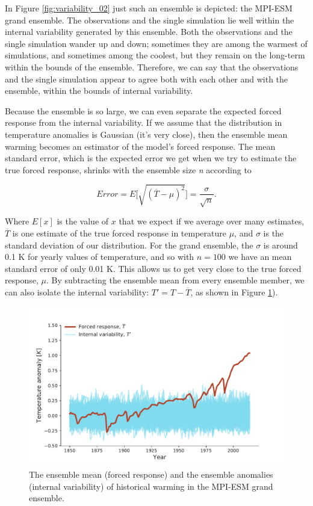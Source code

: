 \documentclass[12pt]{book}
\begin{document}
In Figure \ref{fig:variability_02} just such an ensemble is depicted: the MPI-ESM grand ensemble. The observations and the single simulation lie well within the internal variability generated by this ensemble. Both the observations and the single simulation wander up and down; sometimes they are among the warmest of simulations, and sometimes among the coolest, but they remain on the long-term within the bounds of the ensemble. Therefore, we can say that the observations and the single simulation appear to agree both with each other and with the ensemble, within the bounds of internal variability.

Because the ensemble is so large, we can even separate the expected forced response from the internal variability. If we assume that the distribution in temperature anomalies is Gaussian (it's very close), then the ensemble mean warming becomes an estimator of the model's forced response. The mean standard error, which is the expected error we get when we try to estimate the true forced response, shrinks with the ensemble size \textit{n} according to

\begin{equation}
Error = E \lbrack \sqrt{\left(  \overline{T} - \mu  \right)^{2}}  \rbrack = \frac{\sigma}{\sqrt{n}}.
\label{eq:mse}
\end{equation}

Where $E[x]$ is the value of $x$ that we expect if we average over many estimates, $\overline{T}$ is one estimate of the true forced response in temperature $\mu$, and $\sigma$ is the standard deviation of our distribution. For the grand ensemble, the $\sigma$ is around 0.1 K for yearly values of temperature, and so with $n=100$ we have an mean standard error of only 0.01 K. This allows us to get very close to the true forced response, $\mu$.  By subtracting the ensemble mean from every ensemble member, we can also isolate the internal variability: $T' = T - \overline{T}$, as shown in Figure \ref{fig:variability_03}).

\begin{figure}
	\begin{center}
		\includegraphics[width=16 cm]{../plots/Variability03.pdf}
	\end{center}
	\caption{The ensemble mean (forced response) and the ensemble anomalies (internal variability) of historical warming in the MPI-ESM grand ensemble.} 
	\label{fig:variability_03}
\end{figure}
\end{document}
